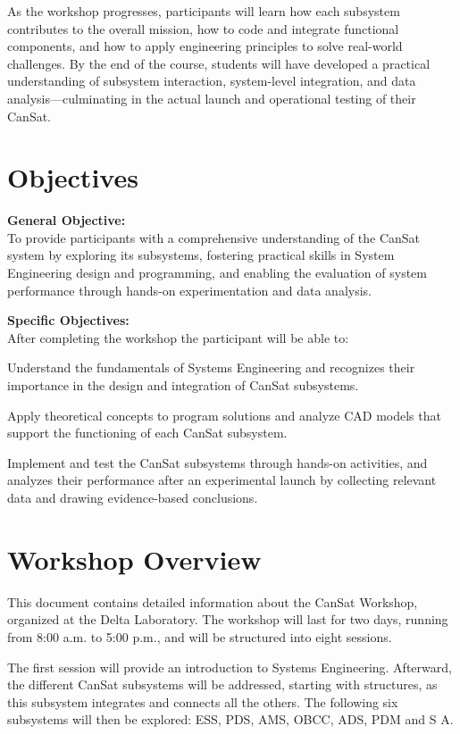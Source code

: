 \documentclass[a4paper,12pt]{article}
\begin{document}
As the workshop progresses, participants will learn how each subsystem contributes to the overall mission, how to code and integrate functional components, and how to apply engineering principles to solve real-world challenges. By the end of the course, students will have developed a practical understanding of subsystem interaction, system-level integration, and data analysis—culminating in the actual launch and operational testing of their CanSat.


\newpage

\section{Objectives}

\textbf{General Objective: }
\\
To provide participants with a comprehensive understanding of the CanSat system by exploring its subsystems, fostering practical skills in System Engineering design and programming, and enabling the evaluation of system performance through hands-on experimentation and data analysis.


\textbf{Specific Objectives:}
\\
After completing the workshop the participant will be able to:

Understand the fundamentals of Systems Engineering and recognizes their importance in the design and integration of CanSat subsystems.

Apply theoretical concepts to program solutions and analyze CAD models that support the functioning of each CanSat subsystem.

Implement and test the CanSat subsystems through hands-on activities, and analyzes their performance after an experimental launch by collecting relevant data and drawing evidence-based conclusions.


\newpage

\section{Workshop Overview}

This document contains detailed information about the CanSat Workshop, organized at the Delta Laboratory. The workshop will last for two days, running from 8:00 a.m. to 5:00 p.m., and will be structured into eight sessions.

The first session will provide an introduction to Systems Engineering. Afterward, the different CanSat subsystems will be addressed, starting with structures, as this subsystem integrates and connects all the others. The following six subsystems will then be explored: ESS, PDS, AMS, OBCC, ADS, PDM and S A. 
\end{document}
